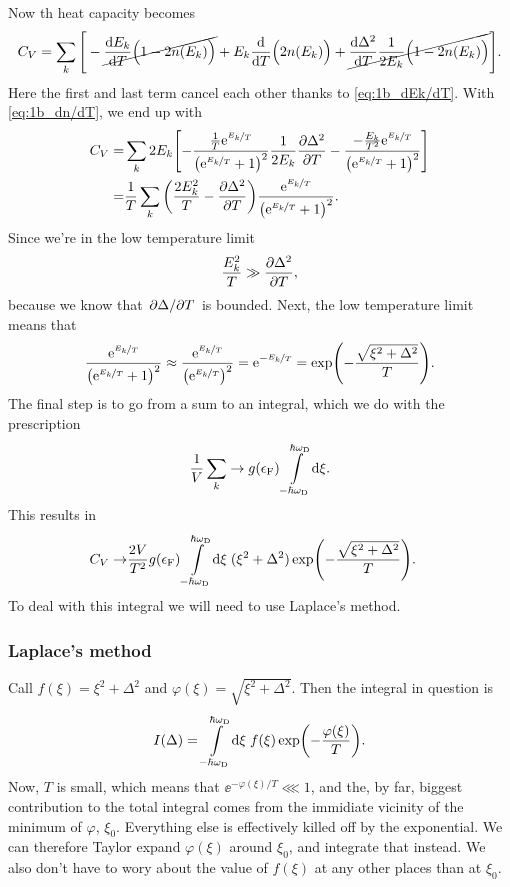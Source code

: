 \documentclass[11pt,letter, swedish, english
]{article}
\newcommand{\eF}{\ensuremath{\epsilon_{\text{F}}}}
\newcommand{\wD}{\ensuremath{\omega_{\text{D}}}}
\begin{document}
Now th heat capacity becomes
\begin{equation}
C_V=\sum_k\Bigg[
-\cancel{\dv{E_k}{T}\Big(1-2n(E_k)\Big)}
+E_k\dv{T}\Big(2n(E_k)\Big)
+\cancel{\dv{\Delta^2}{T}\frac{1}{2E_k}\Big(1-2n(E_k)\Big)}
\Bigg].
\end{equation}
Here the first and last term cancel each other thanks to
\eqref{eq:1b_dEk/dT}. With \eqref{eq:1b_dn/dT}, we end up with
\begin{equation}
\begin{aligned}
C_V=&\sum_k2E_k\qty[
-\frac{\frac{1}{T}\mathrm{e}^{\nicefrac{E_k}{T}}}
{\qty(\mathrm{e}^{\nicefrac{E_k}{T}}+1)^2} \frac{1}{2E_k}\pdv{\Delta^2}{T}
-\frac{-\frac{E_k}{T^2}\mathrm{e}^{\nicefrac{E_k}{T}}}
{\qty(\mathrm{e}^{\nicefrac{E_k}{T}}+1)^2} ]\\
=&\frac{1}{T}\sum_k\qty(\frac{2E_k^2}{T}-\pdv{\Delta^2}{T})
\frac{\mathrm{e}^{\nicefrac{E_k}{T}}}{\qty(\mathrm{e}^{\nicefrac{E_k}{T}}+1)^2}.
\end{aligned}
\end{equation}
Since we're in the low temperature limit 
\begin{equation}
\frac{E_k^2}{T}\gg\pdv{\Delta^2}{T},
\end{equation}
because we know that $\pdv*{\Delta}{T}$ is bounded. Next, the low
temperature limit means that
\begin{equation}
\frac{\mathrm{e}^{\nicefrac{E_k}{T}}}{\qty(\mathrm{e}^{\nicefrac{E_k}{T}}+1)^2}
\approx
\frac{\mathrm{e}^{\nicefrac{E_k}{T}}}{\qty(\mathrm{e}^{\nicefrac{E_k}{T}})^2}
=\mathrm{e}^{-\nicefrac{E_k}{T}}
=\exp(-\frac{\sqrt{\xi^2+\Delta^2}}{T}).
\end{equation}
The final step is to go from a sum to an integral, which we do with
the prescription
\begin{equation}\label{eq:1_sum_int}
\frac{1}{V}\sum_k \to g(\eF)\int_{-\hbar\wD}^{\hbar\wD}\!\rd\xi.
\end{equation}
This results in
\begin{equation}
\begin{aligned}
C_V\to&\frac{2V}{T^2}g(\eF)\int_{-\hbar\wD}^{\hbar\wD}\!\rd\xi\;
(\xi^2+\Delta^2)\exp(-\frac{\sqrt{\xi^2+\Delta^2}}{T}).
\end{aligned}
\end{equation}
To deal with this integral we will need to use Laplace's method.

\subsubsection*{Laplace's method}
Call $f(\xi)=\xi^2+\Delta^2$ and
$\varphi(\xi)=\sqrt{\xi^2+\Delta^2}$. Then the integral in question is
\begin{equation}
I(\Delta)=\int_{-\hbar\wD}^{\hbar\wD}\!\rd\xi\;f(\xi)\exp(-\frac{\varphi(\xi)}{T}).
\end{equation}
Now, $T$ is small, which means that $\ee^{-\varphi(\xi)/T}\lll1$, and
the, by far, biggest contribution to the total integral comes from the
immidiate vicinity of the minimum of $\varphi$, $\xi_0$. Everything else is
effectively killed off by the exponential. 
We can therefore Taylor expand $\varphi(\xi)$ around $\xi_0$, and
integrate that instead. 
We also don't have to wory about the value of $f(\xi)$ at any other
places than at $\xi_0$.
\end{document}
